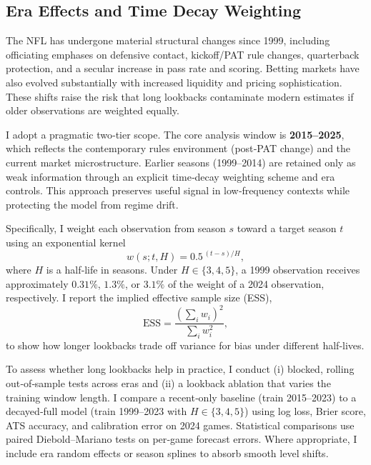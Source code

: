 \subsection{Era Effects and Time Decay Weighting}
\label{subsec:era-effects}
\label{sec:timeframe-lookback}  %
The NFL has undergone material structural changes since 1999, including officiating emphases on defensive contact, kickoff/PAT rule changes, quarterback protection, and a secular increase in pass rate and scoring. Betting markets have also evolved substantially with increased liquidity and pricing sophistication. These shifts raise the risk that long lookbacks contaminate modern estimates if older observations are weighted equally.

I adopt a pragmatic two‑tier scope. The core analysis window is \textbf{2015--2025}, which reflects the contemporary rules environment (post‑PAT change) and the current market microstructure. Earlier seasons (1999--2014) are retained only as weak information through an explicit time‑decay weighting scheme and era controls. This approach preserves useful signal in low‑frequency contexts while protecting the model from regime drift.

Specifically, I weight each observation from season $s$ toward a target season $t$ using an exponential kernel
\begin{equation}
w(s; t, H) = 0.5^{\,(t - s)/H},
\end{equation}
where $H$ is a half‑life in seasons. Under $H\in\{3,4,5\}$, a 1999 observation receives approximately $0.31\%$, $1.3\%$, or $3.1\%$ of the weight of a 2024 observation, respectively. I report the implied effective sample size (ESS),
\begin{equation}
\mathrm{ESS} = \frac{\left(\sum_i w_i\right)^2}{\sum_i w_i^2},
\end{equation}
to show how longer lookbacks trade off variance for bias under different half‑lives.

To assess whether long lookbacks help in practice, I conduct (i) blocked, rolling out‑of‑sample tests across eras and (ii) a lookback ablation that varies the training window length. I compare a recent‑only baseline (train 2015--2023) to a decayed‑full model (train 1999--2023 with $H\in\{3,4,5\}$) using log loss, Brier score, ATS accuracy, and calibration error on 2024 games. Statistical comparisons use paired Diebold--Mariano tests on per‑game forecast errors. Where appropriate, I include era random effects or season splines to absorb smooth level shifts.

